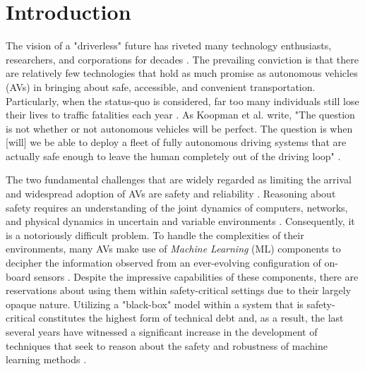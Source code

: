 \documentclass[manuscript,screen,review]{acmart}
\newcommand{\todo}[1]{\textcolor{red}{\textbf{\underline{TODO:}} #1}}
\begin{document}





\maketitle

\section{Introduction}


The vision of a "driverless" future has riveted many technology enthusiasts, researchers, and corporations for decades \cite{Badue2019}. The prevailing conviction is that there are relatively few technologies that hold as much promise as autonomous vehicles (AVs) in bringing about safe, accessible, and convenient transportation. Particularly, when the status-quo is considered, far too many individuals still lose their lives to traffic fatalities each year \cite{Rasouli2020}. As Koopman et al. write, "The question is not whether or not autonomous vehicles will be perfect. The question is when [will] we be able to deploy a fleet of fully autonomous driving systems that are actually safe enough to leave the human completely out of the driving loop" \cite{Koopman2017}. 

The two fundamental challenges that are widely regarded as limiting the arrival and widespread adoption of AVs are safety and reliability \cite{Majumdar2017}. Reasoning about safety requires an understanding of the joint dynamics of computers, networks, and physical dynamics in uncertain and variable environments \cite{Yurtsever2019}. Consequently, it is a notoriously difficult problem. To handle the complexities of their environments, many AVs make use of \emph{Machine Learning} (ML) components to decipher the information observed from an ever-evolving configuration of on-board sensors \cite{Yurtsever2019}. Despite the impressive capabilities of these components, there are reservations about using them within safety-critical settings due to their largely opaque nature. Utilizing a "black-box" model within a system that is safety-critical constitutes the highest form of technical debt \cite{Sculley2015} and, as a result, the last several years have witnessed a significant increase in the development of techniques that seek to reason about the safety and robustness of machine learning methods \cite{xiang20118survey}.
\end{document}
